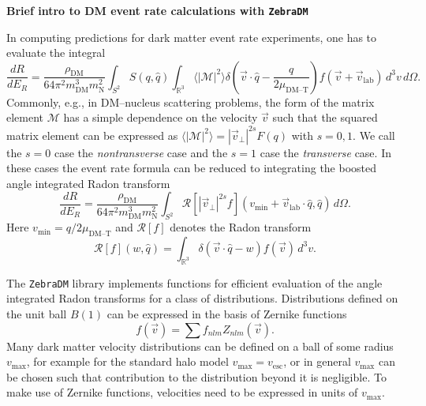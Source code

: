 \documentclass{article}
\newcommand{\der}[2]{\frac{d#1}{d#2}}
\newcommand{\unitv}[1]{\hat{#1}}
\newcommand{\mean}[1]{\langle #1 \rangle}
\newcommand{\difd}{\,d}
\begin{document}
\begin{center}
\large\textbf{Brief intro to DM event rate calculations with \texttt{ZebraDM}}
\end{center}

\noindent
In computing predictions for dark matter event rate experiments, one has to evaluate the integral
\begin{equation}
    \der{R}{E_R} = \frac{\rho_\text{DM}}{64\pi^2m_\text{DM}^3m_\text{N}^2}\int_{S^2}S(q, \unitv{q})\int_{\mathbb{R}^3}\mean{|\mathcal{M}|^2} \delta\left(\vec{v}\cdot\unitv{q}-\frac{q}{2\mu_\text{DM--T}}\right)f(\vec{v}+\vec{v}_\text{lab})\difd^3v \difd\Omega.
\end{equation}
Commonly, e.g., in DM--nucleus scattering problems, the form of the matrix element $\mathcal{M}$ has a simple dependence on the velocity $\vec{v}$ such that the squared matrix element can be expressed as $\mean{|\mathcal{M}|^2}=|\vec{v}_\perp|^{2s}F(q)$ with $s=0,1$. We call the $s=0$ case the \emph{nontransverse} case and the $s=1$ case the \emph{transverse} case. In these cases the event rate formula can be reduced to integrating the boosted angle integrated Radon transform
\begin{equation}
    \der{R}{E_R} = \frac{\rho_\text{DM}}{64\pi^2m_\text{DM}^3m_\text{N}^2}\int_{S^2}\mathcal{R}[|\vec{v}_\perp|^{2s}f](v_\text{min}+\vec{v}_\text{lab}\cdot\unitv{q}, \unitv{q})\difd\Omega.
\end{equation}
Here $v_\text{min}=q/2\mu_\text{DM--T}$ and $\mathcal{R}[f]$ denotes the Radon transform
\begin{equation}
    \mathcal{R}[f](w, \unitv{q}) = \int_{\mathbb{R}^3}\delta(\vec{v}\cdot \unitv{q}-w)f(\vec{v})\difd^3v.
\end{equation}

The \texttt{ZebraDM} library implements functions for efficient evaluation of the angle integrated Radon transforms for a class of distributions. Distributions defined on the unit ball $B(1)$ can be expressed in the basis of Zernike functions
\begin{equation}
    f(\vec{v})=\sum f_{nlm}Z_{nlm}(\vec{v}).
\end{equation}
Many dark matter velocity distributions can be defined on a ball of some radius $v_\text{max}$, for example for the standard halo model $v_\text{max}=v_\text{esc}$, or in general $v_\text{max}$ can be chosen such that contribution to the distribution beyond it is negligible. To make use of Zernike functions, velocities need to be expressed in units of $v_\text{max}$.
\end{document}
